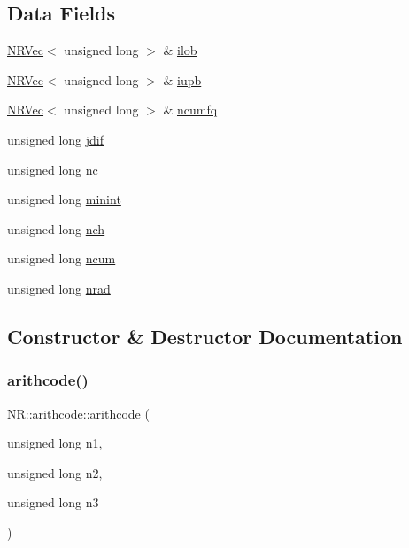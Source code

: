 \subsection*{Data Fields}
\begin{DoxyCompactItemize}
\item 
\mbox{\hyperlink{classNR_1_1NRVec}{N\+R\+Vec}}$<$ unsigned long $>$ \& \mbox{\hyperlink{classNR_1_1arithcode_a2f0f4815da12b7e05ffdda2c6c2cd22b}{ilob}}
\item 
\mbox{\hyperlink{classNR_1_1NRVec}{N\+R\+Vec}}$<$ unsigned long $>$ \& \mbox{\hyperlink{classNR_1_1arithcode_ac8290637848848253e8f83959759620d}{iupb}}
\item 
\mbox{\hyperlink{classNR_1_1NRVec}{N\+R\+Vec}}$<$ unsigned long $>$ \& \mbox{\hyperlink{classNR_1_1arithcode_ab42f8b311dc85df156a07c70ce179a59}{ncumfq}}
\item 
unsigned long \mbox{\hyperlink{classNR_1_1arithcode_ae8879f54067355c1e3fe8902d23834e1}{jdif}}
\item 
unsigned long \mbox{\hyperlink{classNR_1_1arithcode_a40165e7b7f7eeaed40619fa7d246f0a2}{nc}}
\item 
unsigned long \mbox{\hyperlink{classNR_1_1arithcode_a63e003cc67bbdbbdff8c880b7e2d0471}{minint}}
\item 
unsigned long \mbox{\hyperlink{classNR_1_1arithcode_adff76993d50ef77b4aa6f937dac31fb9}{nch}}
\item 
unsigned long \mbox{\hyperlink{classNR_1_1arithcode_a942d481da12f999dd8a6a6cdf701eb13}{ncum}}
\item 
unsigned long \mbox{\hyperlink{classNR_1_1arithcode_a5f878b2a52dbcbd16e23593f6510959c}{nrad}}
\end{DoxyCompactItemize}


\subsection{Constructor \& Destructor Documentation}
\mbox{\label{classNR_1_1arithcode_a796f8507b3d8ca8262843905ea6712ec}} 
\subsubsection{\texorpdfstring{arithcode()}{arithcode()}\hspace{0.1cm}{\footnotesize\ttfamily [1/2]}}
{\footnotesize\ttfamily N\+R\+::arithcode\+::arithcode (\begin{DoxyParamCaption}\item[{unsigned long}]{n1,  }\item[{unsigned long}]{n2,  }\item[{unsigned long}]{n3 }\end{DoxyParamCaption})\hspace{0.3cm}{\ttfamily [inline]}}

